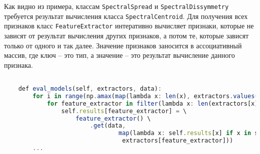 Как видно из примера, классам \texttt{SpectralSpread} и  \texttt{SpectralDissymmetry} требуется результат вычисления класса \texttt{SpectralCentroid}. Для получения всех признаков  класс \texttt{FeatureExtractor} интеративно вычисляет признаки, которые не зависят от результат вычисления других признаков, а потом те, которые зависят только от одного и так далее. Значение признаков заносится в ассоциативный массив, где ключ -- это тип, а значение -- это результат вычисление данного признака.

\begin{lstlisting}[language=TypeScript, label=lst:evalgraph]

    def eval_models(self, extractors, data):
        for i in range(np.amax(map(lambda x: len(x), extractors.values())) + 1):
            for feature_extractor in filter(lambda x: len(extractors[x]) == i, extractors):
                self.results[feature_extractor] = \
                    feature_extractor() \
                        .get(data,
                                map(lambda x: self.results[x] if x in self.results else None,
                                 extractors[feature_extractor]))
        ...
        
\end{lstlisting}